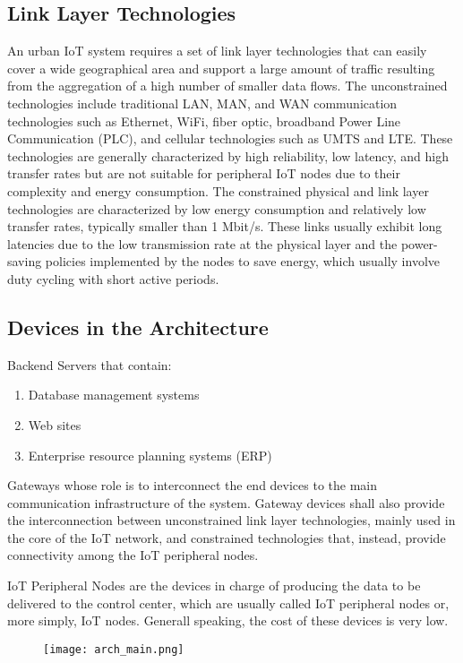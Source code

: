 \documentclass{article}
\begin{document}
\subsection{Link Layer Technologies}

An urban IoT system requires a set of link layer technologies that can easily cover a wide geographical area and support a large amount of traffic resulting from the aggregation of a high number of smaller data flows. The unconstrained technologies include traditional LAN, MAN, and WAN communication technologies such as Ethernet, WiFi, fiber optic, broadband Power Line Communication (PLC), and cellular technologies such as UMTS and LTE. These technologies are generally characterized by high reliability, low latency, and high transfer rates but are not suitable for peripheral IoT nodes due to their complexity and energy consumption. The constrained physical and link layer technologies are characterized by low energy consumption and relatively low transfer rates, typically smaller than 1 Mbit/s. These links usually exhibit long latencies due to the low transmission rate at the physical layer and the power-saving policies implemented by the nodes to save energy, which usually involve duty cycling with short active periods.

\subsection{Devices in the Architecture}

Backend Servers that contain:
\begin{enumerate}
\item Database management systems
\item Web sites
\item Enterprise resource planning systems (ERP)
\end{enumerate}

Gateways whose role is to interconnect the end devices to the main communication infrastructure of the system. Gateway devices shall also provide the interconnection between unconstrained link layer technologies, mainly used in the core of the IoT network, and constrained technologies that, instead, provide connectivity among the IoT peripheral nodes.

IoT Peripheral Nodes are the devices in charge of producing the data to be delivered to the control center, which are usually called IoT peripheral nodes or, more simply, IoT nodes. Generall speaking, the cost of these devices is very low.
\begin{figure}
\texttt{[image: arch\_main.png]}
\end{figure}
\end{document}
